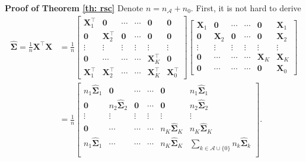 \documentclass[twoside,12pt]{article}
\newcommand{\mb}[1]{\boldsymbol{\mathbf{#1}}}
\newcommand{\wh}[1]{\widehat{#1}}
\begin{document}
\textbf{Proof of Theorem \ref{th: rsc}}
Denote $n=n_{\mathcal A}+n_0$.
First, it is not hard to derive
\begin{equation*}
	\begin{aligned}
		\wh{\mb\Sigma}=\frac1n \mb X^\top\mb X&=\frac1n\begin{bmatrix}
			\mb X^\top_1 & \mb 0 & \cdots&\cdots&\mb 0&\mb 0\\
			\mb 0 & \mb X^\top_2 & \mb 0&\cdots&\mb 0&\mb 0\\
			\vdots&\vdots&\vdots&\vdots&\vdots&\vdots\\
			\mb 0& \cdots&\cdots&\cdots&\mb X^\top_K&\mb 0\\
			\mb X^\top_1& \mb X^\top_2&\cdots&\cdots&\mb X^\top_K&\mb X^\top_0
		\end{bmatrix}     
		\begin{bmatrix}
			\mb X_1 & \mb 0 & \cdots&\cdots&\mb 0&\mb X_1\\
			\mb 0 & \mb X_2 & \mb 0&\cdots&\mb 0&\mb X_2\\
			\vdots&\vdots&\vdots&\vdots&\vdots&\vdots\\
			\mb 0& \cdots&\cdots&\cdots&\mb X_K&\mb X_K\\
			\mb 0& \cdots&\cdots&\cdots&\mb 0&\mb X_0
		\end{bmatrix}\\
		&=\frac1n\begin{bmatrix}
			n_1\wh{\mb\Sigma}_1 & \mb 0 & \cdots&\cdots&\mb 0&n_1\wh{\mb\Sigma}_1\\
			\mb 0 & n_2\wh{\mb\Sigma}_2 & \mb 0&\cdots&\mb 0&n_2\wh{\mb\Sigma}_2\\
			\vdots&\vdots&\vdots&\vdots&\vdots&\vdots\\
			\mb 0& \cdots&\cdots&\cdots&n_K\wh{\mb\Sigma}_K&n_K\wh{\mb\Sigma}_K\\
			n_1\wh{\mb\Sigma}_1& \cdots&\cdots&\cdots&n_K\wh{\mb\Sigma}_K&\sum_{k\in\mathcal{A}\cup\{0\}}n_k\wh{\mb\Sigma}_k\\
		\end{bmatrix}.
	\end{aligned}
\end{equation*}	
\end{document}
